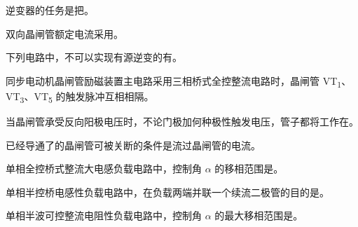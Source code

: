 \documentclass[电力电子]{subfiles}
\begin{document}
\begin{ti}
	逆变器的任务是把。
\end{ti}

\begin{ti}
	双向晶闸管额定电流采用。
\end{ti}

\begin{ti}
	下列电路中，不可以实现有源逆变的有。
\end{ti}

\begin{ti}
	同步电动机晶闸管励磁装置主电路采用三相桥式全控整流电路时，晶闸管 VT\textsubscript{1}、VT\textsubscript{3}、VT\textsubscript{5} 的触发脉冲互相相隔。
\end{ti}

\begin{ti}
	当晶闸管承受反向阳极电压时，不论门极加何种极性触发电压，管子都将工作在。
\end{ti}

\begin{ti}
	已经导通了的晶闸管可被关断的条件是流过晶闸管的电流。
\end{ti}

\begin{ti}
	单相全控桥式整流大电感负载电路中，控制角 $\alpha$ 的移相范围是。
\end{ti}

\begin{ti}
	单相半控桥电感性负载电路中，在负载两端并联一个续流二极管的目的是。
\end{ti}

\begin{ti}
	单相半波可控整流电阻性负载电路中，控制角 $\alpha$ 的最大移相范围是。
\end{ti}
\end{document}
